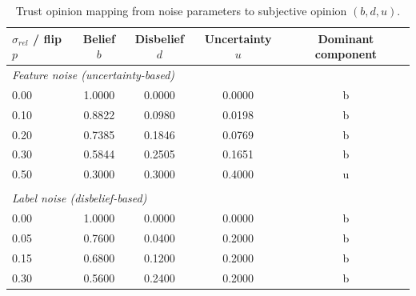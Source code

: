 \begin{table}[ht]
\centering
\caption{Trust opinion mapping from noise parameters to subjective opinion $(b, d, u)$.}
\label{tab:trust-mapping}
\begin{tabular}{lcccc}
\toprule
$\sigma_{rel}$ / flip $p$ & Belief $b$ & Disbelief $d$ & Uncertainty $u$ & Dominant component \\
\midrule
\multicolumn{5}{l}{\textit{Feature noise (uncertainty-based)}} \\
0.00 & 1.0000 & 0.0000 & 0.0000 & b \\
0.10 & 0.8822 & 0.0980 & 0.0198 & b \\
0.20 & 0.7385 & 0.1846 & 0.0769 & b \\
0.30 & 0.5844 & 0.2505 & 0.1651 & b \\
0.50 & 0.3000 & 0.3000 & 0.4000 & u \\
\midrule \\
\multicolumn{5}{l}{\textit{Label noise (disbelief-based)}} \\
0.00 & 1.0000 & 0.0000 & 0.0000 & b \\
0.05 & 0.7600 & 0.0400 & 0.2000 & b \\
0.15 & 0.6800 & 0.1200 & 0.2000 & b \\
0.30 & 0.5600 & 0.2400 & 0.2000 & b \\
\bottomrule
\end{tabular}
\end{table}